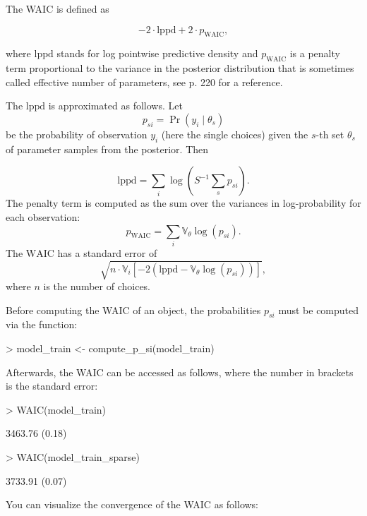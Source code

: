\documentclass[article]{jss}
\newcommand{\fct}[1]{\code{#1()}}
\begin{document}
The WAIC is defined as

$$-2  \cdot \text{lppd} + 2\cdot p_\text{WAIC},$$

where $\text{lppd}$ stands for log pointwise predictive density and $p_\text{WAIC}$ is a penalty term proportional to the variance in the posterior distribution that is sometimes called effective number of parameters, see \cite{McElreath:2016} p. 220 for a reference.

The $\text{lppd}$ is approximated as follows. Let $$p_{si} = \Pr(y_i\mid \theta_s)$$ be the probability of observation $y_i$ (here the single choices) given the $s$-th set $\theta_s$ of parameter samples from the posterior. Then

$$\text{lppd} = \sum_i \log \left( S^{-1} \sum_s p_{si} \right).$$
The penalty term is computed as the sum over the variances in log-probability for each observation:
$$p_\text{WAIC} = \sum_i \mathbb{V}_{\theta}  \log (p_{si}) . $$
The $\text{WAIC}$ has a standard error of
$$\sqrt{n \cdot \mathbb{V}_i \left[-2 \left(\text{lppd} - \mathbb{V}_{\theta}  \log (p_{si})  \right)\right]},$$
where $n$ is the number of choices.

Before computing the WAIC of an  object, the probabilities $p_{si}$ must be computed via the \fct{compute\_p\_si} function:

\begin{Schunk}
\begin{Sinput}
> model_train <- compute_p_si(model_train)
\end{Sinput}
\end{Schunk}

Afterwards, the WAIC can be accessed as follows, where the number in brackets is the standard error:

\begin{Schunk}
\begin{Sinput}
> WAIC(model_train)
\end{Sinput}
\begin{Soutput}
3463.76 (0.18)
\end{Soutput}
\begin{Sinput}
> WAIC(model_train_sparse)
\end{Sinput}
\begin{Soutput}
3733.91 (0.07)
\end{Soutput}
\end{Schunk}

You can visualize the convergence of the WAIC as follows:
\end{document}
